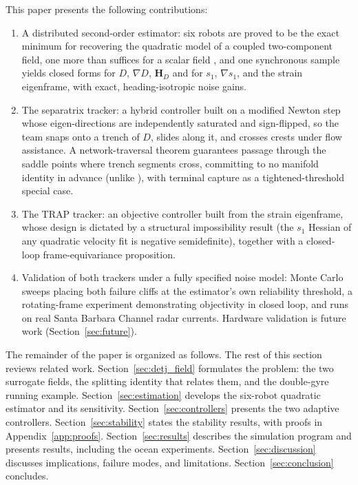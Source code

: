 \documentclass[lettersize,journal]{IEEEtran}
\begin{document}
This paper presents the following contributions:
\begin{enumerate}
    \item A distributed second-order estimator: six robots are proved
          to be the exact minimum for recovering the quadratic model of
          a coupled two-component field, one more than suffices for a
          scalar field \cite{15}, and one synchronous sample yields
          closed forms for $D$, $\nabla D$, $\mathbf{H}_D$ and for
          $s_1$, $\nabla s_1$, and the strain eigenframe, with exact,
          heading-isotropic noise gains.
    \item The separatrix tracker: a hybrid controller built on a
          modified Newton step whose eigen-directions are independently
          saturated and sign-flipped, so the team snaps onto a trench
          of $D$, slides along it, and crosses crests under flow
          assistance. A network-traversal theorem guarantees passage
          through the saddle points where trench segments cross,
          committing to no manifold identity in advance (unlike
          \cite{9,10}), with terminal capture as a tightened-threshold
          special case.
    \item The TRAP tracker: an objective controller built from the
          strain eigenframe, whose design is dictated by a structural
          impossibility result (the $s_1$ Hessian of any quadratic
          velocity fit is negative semidefinite), together with a
          closed-loop frame-equivariance proposition.
    \item Validation of both trackers under a fully specified noise
          model: Monte Carlo sweeps placing both failure cliffs at the
          estimator's own reliability threshold, a rotating-frame
          experiment demonstrating objectivity in closed loop, and runs
          on real Santa Barbara Channel radar currents. Hardware
          validation is future work (Section~\ref{sec:future}).
\end{enumerate}

The remainder of the paper is organized as follows. The rest of this
section reviews related work. Section~\ref{sec:detj_field} formulates
the problem: the two surrogate fields, the splitting identity that
relates them, and the double-gyre running example.
Section~\ref{sec:estimation} develops the six-robot quadratic estimator
and its sensitivity. Section~\ref{sec:controllers} presents the two
adaptive controllers. Section~\ref{sec:stability} states the stability
results, with proofs in Appendix~\ref{app:proofs}.
Section~\ref{sec:results} describes the simulation program and presents
results, including the ocean experiments.
Section~\ref{sec:discussion} discusses implications, failure modes, and
limitations. Section~\ref{sec:conclusion} concludes.
\end{document}
